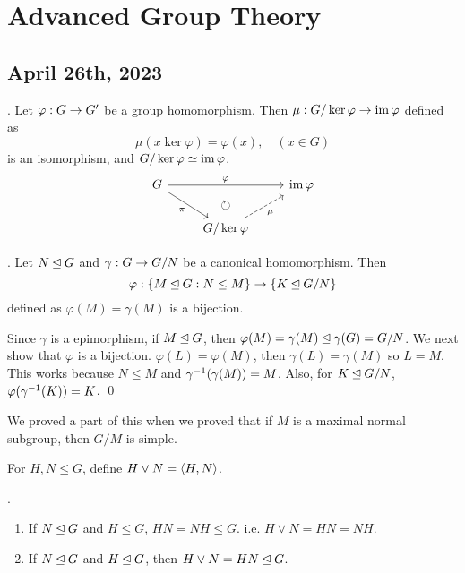 \setcounter{chapter}{6}

\chapter{Advanced Group Theory}

\section*{April 26th, 2023}

\setcounter{topic}{33}


\thm.  Let \(\varphi : G \rightarrow G'\) be a group homomorphism. Then \(\mu : G/ \ker \varphi \rightarrow \operatorname{im} \varphi\) defined as
\[
    \mu(x \ker\varphi) = \varphi(x), \quad (x \in G)
\]
is an isomorphism, and \(G / \ker \varphi \simeq \operatorname{im} \varphi\).
\[
    \begin{tikzcd}
        G \arrow{rr}{\varphi} \arrow[swap]{dr}{\pi} & \arrow[d, phantom, "\circlearrowright"]& \im \varphi \\
        & G/\ker\varphi \arrow[dashed,swap]{ur}{\mu} &
    \end{tikzcd}
\]

\lemma. Let \(N \unlhd G\) and \(\gamma : G \rightarrow G / N\) be a canonical homomorphism. Then
\[
    \varphi: \{M \unlhd G : N \leq M\} \rightarrow \{K \unlhd G/N\}
\]
defined as \(\varphi(M) = \gamma(M)\) is a bijection.

\pf Since \(\gamma\) is a epimorphism, if \(M \unlhd G\), then \(\varphi(M) = \gamma(M) \unlhd \gamma(G) = G/N\). We next show that \(\varphi\) is a bijection. \(\varphi(L) = \varphi(M)\), then \(\gamma(L) = \gamma(M)\) so \(L = M\). This works because \(N \leq M\) and \(\gamma^{-1}(\gamma(M)) = M\). Also, for \(K \unlhd G/N\), \(\varphi(\gamma^{-1}(K)) = K\). \qed

\recall We proved a part of this when we proved that if \(M\) is a maximal normal subgroup, then \(G/M\) is simple.

\notation For \(H, N \leq G\), define \(H \vee N = \left\langle H, N \right\rangle\).

\lemma.
\begin{enumerate}
    \item If \(N \unlhd G\) and \(H \leq G\), \(HN = NH \leq G\). i.e. \(H \vee N = HN = NH\).
    \item If \(N \unlhd G\) and \(H \unlhd G\), then \(H \vee N = HN \unlhd G\).
\end{enumerate}

